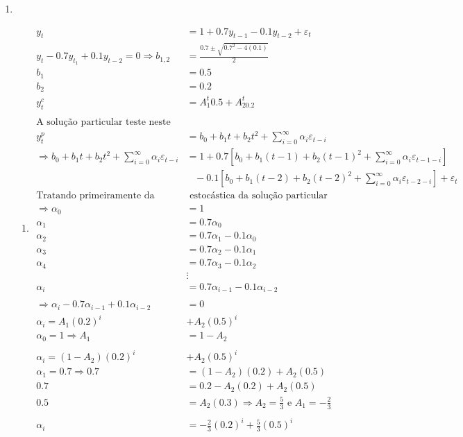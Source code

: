 \begin{enumerate}
\begin{enumerate}
\end{enumerate}

\item %

\begin{enumerate}
	\item %
	
	\begin{align*}
		 y_t &= 1 + 0.7y_{t-1} - 0.1y_{t-2} + \varepsilon_t\\
		y_t -0.7y_{t_1} + 0.1y_{t-2} =0 \Rightarrow b_{1,2}&=\frac{0.7\pm \sqrt{0.7^2-4(0.1)}}{2}\\
		 b_1&=0.5\\
		 b_2&=0.2\\
		 y_t^c&=A_1^t0.5+A_20.2^t\\
		 \\
		\text{A solução particular teste neste caso é}\\
		 y_t^p&=b_0+b_1t+b_2t^2+\sum\limits_{i=0}^{\infty}\alpha_i\varepsilon_{t-i}\\
		 \Rightarrow b_0+b_1t+b_2t^2+\sum\limits_{i=0}^{\infty}\alpha_i\varepsilon_{t-i}&=1+0.7[b_0+b_1(t-1)+b_2(t-1)^2+\sum\limits_{i=0}^{\infty}\alpha_i\varepsilon_{t-1-i}]\\
		 &\;\;\;-0.1[b_0+b_1(t-2)+b_2(t-2)^2+\sum\limits_{i=0}^{\infty}\alpha_i\varepsilon_{t-2-i}]+\varepsilon_t\\
		 \text{Tratando primeiramente da parte}&\text{ estocástica da solução particular}\\
		 \Rightarrow \alpha_0&=1\\
				 \alpha_1&=0.7\alpha_0\\
				 \alpha_2&=0.7\alpha_1-0.1\alpha_0\\
				 \alpha_3&=0.7\alpha_2-0.1\alpha_1\\
				 \alpha_4&=0.7\alpha_3-0.1\alpha_2\\
				 &\vdots\\
				 \alpha_i&=0.7\alpha_{i-1}-0.1\alpha_{i-2}\\
				 \\
				 \Rightarrow  \alpha_i-0.7\alpha_{i-1}+0.1\alpha_{i-2}&=0\\
				 \alpha_i=A_1(0.2)^i&+A_2(0.5)^i\\
				 \alpha_0=1 \Rightarrow A_1&=1-A_2\\
				 \\
				  \alpha_i=(1-A_2)(0.2)^i&+A_2(0.5)^i\\
				 \alpha_1=0.7\Rightarrow 0.7&=(1-A_2)(0.2)+A_2(0.5)\\
				 0.7&=0.2-A_2(0.2)+A_2(0.5)\\
				 0.5&=A_2(0.3)\Rightarrow A_2=\frac{5}{3} \text{ e } A_1=-\frac{2}{3}\\
				 \\
				 \alpha_i&=-\frac{2}{3}(0.2)^i+\frac{5}{3}(0.5)^i
	\end{align*}
	

\end{enumerate}
\end{enumerate}
